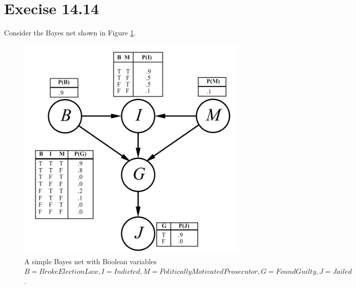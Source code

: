 \documentclass{article}
\begin{document}
\section{Execise 14.14}
Consider the Bayes net shown in Figure \ref{fig:2}.
\begin{figure}[ht]
  \centering
  \includegraphics[scale=0.3]{fig14_23.jpg}
  \caption{A simple Bayes net with Boolean variables $B =
    BrokeElectionLaw, I = Indicted, M =
    PoliticallyMotivatedProsecutor, G = FoundGuilty, J = Jailed$. }
  \label{fig:2}
\end{figure}
\end{document}
